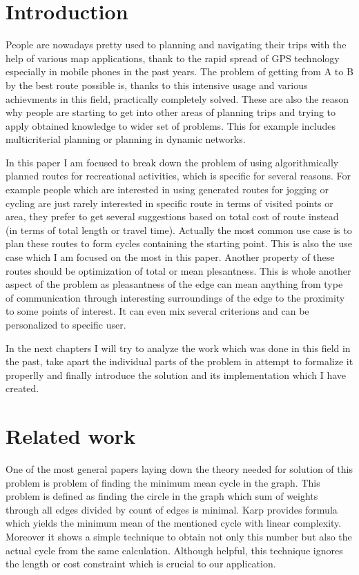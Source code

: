 \documentclass{ctuthesis}
\begin{document}
\maketitle
\chapter{Introduction}
People are nowadays pretty used to planning and navigating their trips with the help of various map applications, thank to the rapid spread of GPS technology especially in mobile phones in the past years. The problem of getting from A to B by the best route possible is, thanks to this intensive usage and various achievments in this field, practically completely solved. These are also the reason why people are starting to get into other areas of planning trips and trying to apply obtained knowledge to wider set of problems. This for example includes multicriterial planning or planning in dynamic networks. \par
In this paper I am focused to break down the problem of using algorithmically planned routes for recreational activities, which is specific for several reasons. For example people which are interested in using generated routes for jogging or cycling are just rarely interested in specific route in terms of visited points or area, they prefer to get several suggestions based on total cost of route instead (in terms of total length or travel time). Actually the most common use case is to plan these routes to form cycles containing the starting point. This is also the use case which I am focused on the most in this paper. Another property of these routes should be optimization of total or mean plesantness. This is whole another aspect of the problem as pleasantness of the edge can mean anything from type of communication through interesting surroundings of the edge to the proximity to some points of interest. It can even mix several criterions and can be personalized to specific user. \par
In the next chapters I will try to  analyze the work which was done in this field in the past, take apart the individual parts of the problem in attempt to formalize it properlly and finally introduce the solution and its implementation which I have created.
\chapter{Related work}



One of the most general papers laying down the theory needed for solution of this problem is problem of finding the minimum mean cycle in the graph. \cite{karp} This problem is defined as finding the circle in the graph which sum of weights through all edges divided by count of edges is minimal. Karp provides formula which yields the minimum mean of the mentioned cycle with linear complexity. Moreover it shows a simple technique to obtain not only this number but also the actual cycle from the same calculation. Although helpful, this technique ignores the length or cost constraint which is crucial to our application.\par
\end{document}
